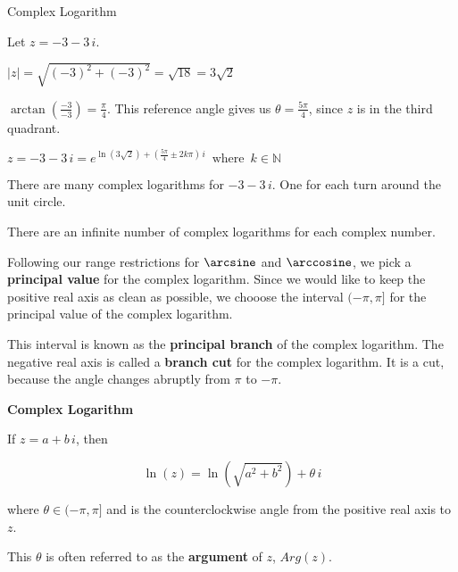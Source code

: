 \documentclass{ximera}
\begin{document}
\begin{example} Complex Logarithm


Let $z = -3 - 3 \, i$.


$|z| = \sqrt{(-3)^2 + (-3)^2} =  \sqrt{18} = 3 \sqrt{2}$


$\arctan\left(\frac{-3}{-3}\right) = \frac{\pi}{4}$.  This reference angle gives us $\theta = \frac{5 \pi}{4}$, since $z$ is in the third quadrant.




$z = -3 - 3 \, i =  e^{\ln(3 \sqrt{2}) + \left( \tfrac{5 \pi}{4} \pm 2 k \pi \right) \, i}     \, \text{ where } \, k \in \mathbb{N}  $


There are many complex logarithms for $-3 - 3 \, i$. One for each turn around the unit circle.



\end{example}




There are an infinite number of complex logarithms for each complex number.


Following our range restrictions for $\arcsine$ and $\arccosine$, we pick a \textbf{principal value} for the complex logarithm. Since we would like to keep the positive real axis as clean as possible, we chooose the interval $(-\pi, \pi]$ for the principal value of the complex logarithm.

This interval is known as the \textbf{principal branch} of the complex logarithm.  The negative real axis is called a \textbf{branch cut} for the complex logarithm. It is a cut, because the angle changes abruptly from $\pi$ to $-\pi$.





\begin{definition}   \textbf{\textcolor{green!50!black}{Complex Logarithm}}
 
If $z = a + b \, i$, then 

\[   \ln(z) = \ln(\sqrt{a^2 + b^2}) + \theta \, i       \]



where $\theta \in (-\pi, \pi]$ and is the counterclockwise angle from the positive real axis to $z$.



This $\theta$ is often referred to as the \textbf{argument} of $z$, $Arg(z)$.



\end{definition}
\end{document}
